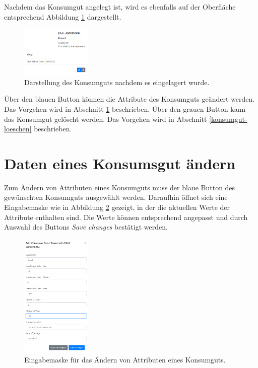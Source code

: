 Nachdem das Konsumgut angelegt ist, wird es ebenfalls auf der Oberfläche entsprechend Abbildung \ref{fig:gui-created-item} dargestellt.

\begin{figure}[H]
	\centering
	\includegraphics[width=0.3\textwidth]{Bilder/gui/new/gui-created-item.PNG}
	\caption[Darstellung angelegtes Konsumgut.]{Darstellung des Konsumguts nachdem es eingelagert wurde.}
	\label{fig:gui-created-item}
\end{figure}

Über den blauen Button können die Attribute des Konsumguts geändert werden.
Das Vorgehen wird in Abschnitt \ref{konsumgut-aendern} beschrieben.
Über den grauen Button kann das Konsumgut gelöscht werden.
Das Vorgehen wird in Abschnitt \ref{konsumgut-loeschen} beschrieben.

\section{Daten eines Konsumsgut ändern}
\label{konsumgut-aendern}
Zum Ändern von Attributen eines Konsumguts muss der blaue Button des gewünschten Konsumguts ausgewählt werden.
Daraufhin öffnet sich eine Eingabemaske wie in Abbildung \ref{fig:gui-edit} gezeigt, in der die aktuellen Werte der Attribute enthalten sind.
Die Werte können entsprechend angepasst und durch Auswahl des Buttons \textit{Save changes} bestätigt werden.
\begin{figure}[H]
	\centering
	\includegraphics[width=0.3\textwidth]{Bilder/gui/new/gui-edit-consumer-goods.PNG}
	\caption[Daten eines Konsumguts ändern.]{Eingabemaske für das Ändern von Attributen eines Konsumguts.}
	\label{fig:gui-edit}
\end{figure}

